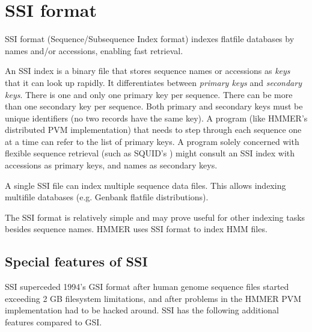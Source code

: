 \documentclass[12pt]{report}
\begin{document}


\section{SSI format}

SSI format (Sequence/Subsequence Index format) indexes flatfile
databases by names and/or accessions, enabling fast retrieval.

An SSI index is a binary file that stores sequence names or accessions
as \emph{keys} that it can look up rapidly. It differentiates between
\emph{primary keys} and \emph{secondary keys}.  There is one and only
one primary key per sequence. There can be more than one secondary key
per sequence. Both primary and secondary keys must be unique
identifiers (no two records have the same key). A program (like
HMMER's distributed PVM implementation) that needs to step through
each sequence one at a time can refer to the list of primary keys. A
program solely concerned with flexible sequence retrieval (such as
SQUID's ) might consult an SSI index with accessions as
primary keys, and names as secondary keys.

A single SSI file can index multiple sequence data files. This allows
indexing multifile databases (e.g. Genbank flatfile distributions).

The SSI format is relatively simple and may prove useful for other
indexing tasks besides sequence names. HMMER uses SSI format to index
HMM files.

\subsection{Special features of SSI}

SSI superceded 1994's GSI format after human genome sequence files
started exceeding 2 GB filesystem limitations, and after problems in
the HMMER PVM implementation had to be hacked around. SSI has the
following additional features compared to GSI.
\end{document}
